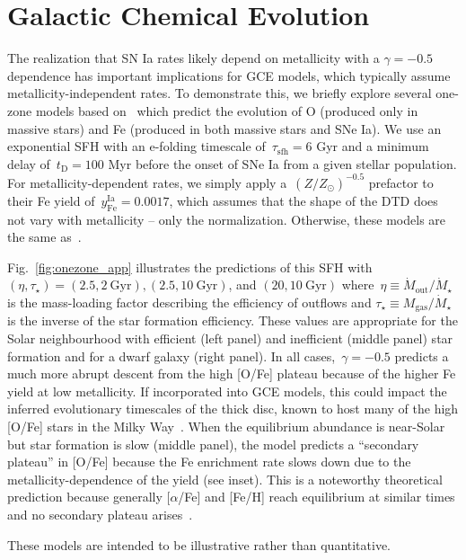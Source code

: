 \documentclass[foo.tex]{subfiles}
\begin{document}
\section{Galactic Chemical Evolution}
\label{sec:gce}

The realization that SN Ia rates likely depend on metallicity with a
$\gamma = -0.5$ dependence has important implications for GCE models,
which typically assume metallicity-independent rates.
To demonstrate this, we briefly explore several one-zone models based
on~\citet{Johnson2020} which predict the evolution of O (produced only in
massive stars) and Fe (produced in both massive stars and SNe Ia).
We use an exponential SFH with an e-folding timescale of~$\tau_\text{sfh} = 6$
Gyr and a minimum delay of~$t_\text{D} = 100$ Myr before the onset of SNe Ia
from a given stellar population.
For metallicity-dependent rates, we simply apply a~$(Z / Z_\odot)^{-0.5}$
prefactor to their Fe yield of~$y_\text{Fe}^\text{Ia} = 0.0017$, which assumes
that the shape of the DTD does not vary with metallicity -- only the
normalization.
Otherwise, these models are the same as~\citet{Johnson2020}.
\par
Fig.~\ref{fig:onezone_app} illustrates the predictions of this SFH with
$(\eta, \tau_\star) = (2.5, 2~\text{Gyr}), (2.5, 10~\text{Gyr})$, and
$(20, 10~\text{Gyr})$ where~$\eta \equiv \dot{M}_\text{out} / \dot{M}_\star$ is
the mass-loading factor describing the efficiency of outflows and
$\tau_\star \equiv M_\text{gas} / \dot{M}_\star$ is the inverse of the
star formation efficiency.
These values are appropriate for the Solar neighbourhood with efficient (left
panel) and inefficient (middle panel) star formation and for a dwarf galaxy
(right panel).
In all cases,~$\gamma = -0.5$ predicts a much more abrupt descent from the
high [O/Fe] plateau because of the higher Fe yield at low metallicity.
If incorporated into GCE models, this could impact the inferred evolutionary
timescales of the thick disc, known to host many of the high [O/Fe] stars in
the Milky Way~\citep{Hayden2017}.
When the equilibrium abundance is near-Solar but star formation is slow (middle
panel), the model predicts a ``secondary plateau'' in [O/Fe] because the Fe
enrichment rate slows down due to the metallicity-dependence of the yield
(see inset).
This is a noteworthy theoretical prediction because generally
[$\alpha$/Fe] and [Fe/H] reach equilibrium at similar times and no secondary
plateau arises~\citep[e.g.,][]{Weinberg2017}.
\par
These models are intended to be illustrative rather than quantitative.
\end{document}
